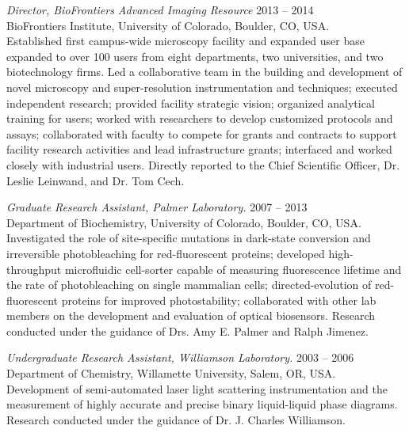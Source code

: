 {\sl Director, BioFrontiers Advanced Imaging Resource} \hfill 2013 -- 2014 \\ 
BioFrontiers Institute, University of Colorado, Boulder, CO, USA. \hfill \\
\forceindent Established first campus-wide microscopy facility and expanded user base expanded to over 100 users from eight departments, two universities, and two biotechnology firms. Led a collaborative team in the building and development of novel microscopy and super-resolution instrumentation and techniques; executed independent research; provided facility strategic vision; organized analytical training for users; worked with researchers to develop customized protocols and assays; collaborated with faculty to compete for grants and contracts to support facility research activities and lead infrastructure grants;  interfaced and worked closely with industrial users.  Directly reported to the Chief Scientific Officer, Dr. Leslie Leinwand, and Dr. Tom Cech.

{\sl Graduate Research Assistant, Palmer Laboratory.} \hfill 2007 -- 2013 \\ 
Department of Biochemistry, University of Colorado, Boulder, CO, USA. \\
\forceindent Investigated the role of site-specific mutations in dark-state conversion and irreversible photobleaching for red-fluorescent proteins; developed high-throughput microfluidic cell-sorter capable of measuring fluorescence lifetime and the rate of photobleaching on single mammalian cells; directed-evolution of red-fluorescent proteins for improved photostability; collaborated with other lab members on the development and evaluation of optical biosensors.  Research conducted under the guidance of Drs. Amy E. Palmer and Ralph Jimenez. 

 {\sl Undergraduate Research Assistant, Williamson Laboratory.} \hfill 2003 -- 2006 \\ 
Department of Chemistry, Willamette University, Salem, OR, USA. \hfill \\
\forceindent Development of semi-automated laser light scattering instrumentation and the measurement of highly accurate and precise binary liquid-liquid phase diagrams.  Research conducted under the guidance of Dr. J. Charles Williamson.